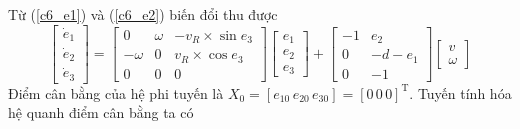           \hspace{0.6cm}Từ (\ref{c6_e1}) và  (\ref{c6_e2}) biến đổi thu được
          \begin{equation}
               \begin{bmatrix}
                    \dot{e}_1 \\
                    \dot{e}_2 \\
                    \dot{e}_3
                    \end{bmatrix} = \begin{bmatrix}
                    0 & \omega & -v_R \times \sin e_3 \\
                    -\omega & 0 & v_R \times \cos e_3 \\
                    0 & 0 & 0
                    \end{bmatrix} \begin{bmatrix}
                    e_1 \\
                    e_2 \\
                    e_3
                    \end{bmatrix} + \begin{bmatrix}
                    -1 & e_2 \\
                    0 & -d - e_1 \\
                    0 & -1
                    \end{bmatrix} \begin{bmatrix}
                    v \\
                    \omega
               \end{bmatrix}
               \label{c6_e*}  
          \end{equation}
          \hspace{0.6cm}Điểm cân bằng của hệ phi tuyến là $X_0 = [e_{10} \, e_{20} \, e_{30}] = [0 \, 0 \, 0]^{\text{T}}$. Tuyến tính hóa hệ quanh điểm cân bằng ta có
